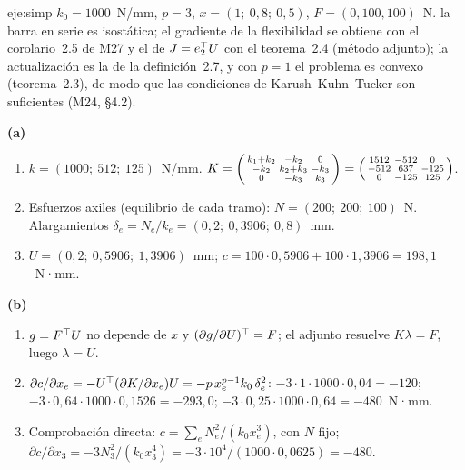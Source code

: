 \begin{solucion}{eje:simp}
\datos $k_0=1000$~N/mm, $p=3$, $x=(1;\ 0{,}8;\ 0{,}5)$, $F=(0,100,100)$~N.
\planteamiento la barra en serie es isostática; el gradiente de la flexibilidad se obtiene con el corolario~2.5 de M27 y el de $J=e_2^{\top} U$ con el teorema~2.4 (método adjunto); la actualización es la de la definición~2.7, y con $p=1$ el problema es convexo (teorema~2.3), de modo que las condiciones de Karush--Kuhn--Tucker son suficientes (M24, §4.2).
\pasos

\noindent\textbf{(a)}
\begin{enumerate}[label=\arabic*.]
  \item $k=(1000;\ 512;\ 125)$~N/mm. $K=\begin{psmallmatrix}k_1+k_2&-k_2&0\\-k_2&k_2+k_3&-k_3\\0&-k_3&k_3\end{psmallmatrix}=\begin{psmallmatrix}1512&-512&0\\-512&637&-125\\0&-125&125\end{psmallmatrix}$.
  \item Esfuerzos axiles (equilibrio de cada tramo): $N=(200;\ 200;\ 100)$~N. Alargamientos $\delta_e=N_e/k_e=(0{,}2;\ 0{,}3906;\ 0{,}8)$~mm.
  \item $U=(0{,}2;\ 0{,}5906;\ 1{,}3906)$~mm; $c=100\cdot 0{,}5906+100\cdot 1{,}3906=198{,}1$~N·mm.
\end{enumerate}

\noindent\textbf{(b)}
\begin{enumerate}[label=\arabic*.]
  \item $g=F^{\top} U$ no depende de $x$ y $(\partial g/\partial U)^{\top}=F$; el adjunto resuelve $K\lambda=F$, luego $\lambda=U$.
  \item $\partial c/\partial x_e=-U^{\top}(\partial K/\partial x_e)U=-p\,x_e^{p-1}k_0\,\delta_e^{2}$: $-3\cdot 1\cdot 1000\cdot 0{,}04=-120$; $-3\cdot 0{,}64\cdot 1000\cdot 0{,}1526=-293{,}0$; $-3\cdot 0{,}25\cdot 1000\cdot 0{,}64=-480$~N·mm.
  \item Comprobación directa: $c=\sum_eN_e^{2}/(k_0x_e^{3})$, con $N$ fijo; $\partial c/\partial x_3=-3N_3^{2}/(k_0x_3^{4})=-3\cdot 10^{4}/(1000\cdot 0{,}0625)=-480$.
\end{enumerate}


\end{solucion}
